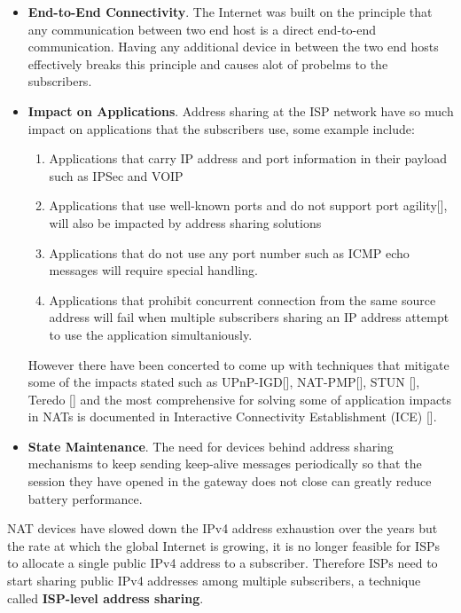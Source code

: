 \documentclass[iwp,first]{luthesis}
\begin{document}
\begin{itemize}

\item {\bf End-to-End Connectivity}. The Internet was built on the principle that any communication between two end host is a direct end-to-end communication. Having any additional device in between the two end hosts effectively breaks this principle and causes alot of probelms to the subscribers. 

\item {\bf Impact on Applications}. Address sharing at the ISP network have so much impact on applications that the subscribers use, some example include:
 
	\begin{enumerate}

		\item Applications that carry IP address and port information in their payload such as IPSec and VOIP

		\item Applications that use well-known ports and do not support port agility[], will also be impacted by address sharing solutions
	
		\item Applications that do not use any port number such as ICMP echo messages will require special handling.

		\item Applications that prohibit concurrent connection from the same source address will fail when multiple subscribers sharing an IP address attempt to use the application simultaniously.

	\end{enumerate}


However there have been concerted to come up with techniques that mitigate some of the impacts stated such as UPnP-IGD[], NAT-PMP[], STUN [], Teredo [] and the most comprehensive for solving some of application impacts in NATs is documented in Interactive Connectivity Establishment (ICE) [].  

\item {\bf State Maintenance}. The need for devices behind address sharing mechanisms to keep sending keep-alive messages periodically so that the session they have opened in the gateway does not close can greatly reduce battery performance. 

\end{itemize}

NAT devices have slowed down the IPv4 address exhaustion over the years but the rate at which the global Internet is growing, it is no longer feasible for ISPs to allocate a single public IPv4 address to a subscriber. Therefore ISPs need to start sharing public IPv4 addresses among multiple subscribers, a technique called {\bf ISP-level address sharing}.  
\end{document}
